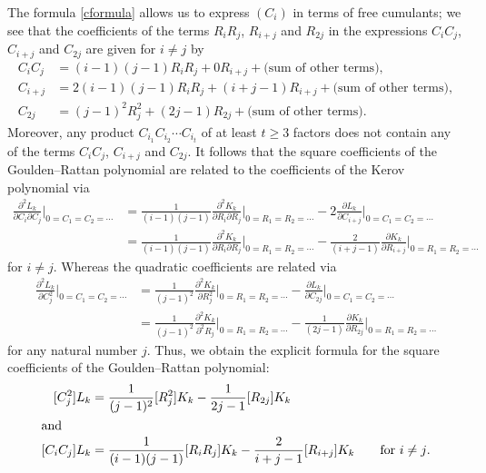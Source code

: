 \documentclass[submission]{FPSAC2021}
\begin{document}
The formula \eqref{cformula} allows us to 
express $(C_i)$ in terms of free cumulants;
we see that the coefficients of the terms 
$R_i R_j$, $R_{i+j}$ and $R_{2j}$ in the expressions
$C_{i} C_{j}$, $C_{i+j}$ and $C_{2j}$ are given for $i \neq j$ by
\begin{align*}
C_i C_j &= (i-1)(j-1) R_i R_j + 0  R_{i+j} + \text{(sum of other terms)},\\
C_{i+j} &=2(i-1)(j-1)R_iR_j+(i+j-1)R_{i+j}+\text{(sum of other terms)},\\
C_{2j} &=(j-1)^2R_j^2+(2j-1)R_{2j}+\text{(sum of other terms)}. 
\end{align*}
Moreover, any product $C_{i_1} C_{i_2}\cdots C_{i_t}$
of at least $t\geq 3$ factors does not contain any 
of the terms $C_i C_j$, $C_{i+j}$ and $C_{2j}$.
It follows that the square coefficients of 
the Goulden--Rattan polynomial are related 
to the coefficients of the Kerov polynomial via
\begin{align*}
\frac{\partial^2L_k}{\partial{C_i}\partial{C_j}}\Bigg|_{0=C_1=C_2=\cdots}
&=\frac{1}{(i-1)(j-1)}\frac{\partial^2K_k}{\partial{R_i}\partial{R_j}}\Bigg|_{0=R_1=R_2=\cdots}
-2\frac{\partial L_k}{\partial{C_{i+j}}}\Bigg|_{0=C_1=C_2=\cdots}\\
&=\frac{1}{(i-1)(j-1)}\frac{\partial^2K_k}{\partial{R_i}\partial{R_j}}\Bigg|_{0=R_1=R_2=\cdots}
-\frac{2}{(i+j-1)}\frac{\partial K_k}{\partial{R_{i+j}}}\Bigg|_{0=R_1=R_2=\cdots}
\end{align*}
for $i \neq j$. Whereas the quadratic coefficients are related via
\begin{align*}
\frac{\partial^2L_k}{\partial{C_j^2}}\Bigg|_{0=C_1=C_2=\cdots}
&=\frac{1}{(j-1)^2}\frac{\partial^2K_k}{\partial{R_j^2}}\Bigg|_{0=R_1=R_2=\cdots}
-\frac{\partial L_k}{\partial{C_{2j}}}\Bigg|_{0=C_1=C_2=\cdots}\\
&=\frac{1}{(j-1)^2}\frac{\partial^2K_k}{\partial^2{R_j}}\Bigg|_{0=R_1=R_2=\cdots}
-\frac{1}{(2j-1)}\frac{\partial K_k}{\partial{R_{2j}}}\Bigg|_{0=R_1=R_2=\cdots}
\end{align*}
for any natural number $j$.
Thus, we obtain the explicit formula for 
the square coefficients of the Goulden–Rattan polynomial:
\begin{align}
\label{formula}
[C_j^2]L_k &=\frac{1}{(j-1)^2}[R_j^2]K_k-\frac{1}{2j-1}[R_{2j}]K_k \\
\intertext{and}
[C_iC_j]L_k &=\frac{1}{(i-1)(j-1)}[R_iR_j]K_k-\frac{2}{i+j-1}[R_{i+j}]K_k
\qquad \text{for $i\neq j$.}
\end{align}
\end{document}
